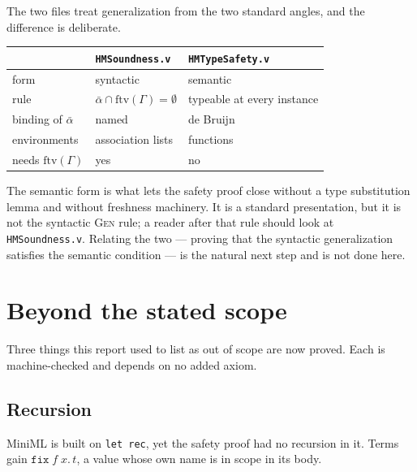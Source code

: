 \documentclass[11pt,a4paper]{article}
\newcommand{\ftv}{\mathrm{ftv}}
\newcommand{\subst}[3]{#1[#2 := #3]}
\newcommand{\step}{\longrightarrow}
\begin{document}
The two files treat generalization from the two standard angles, and the
difference is deliberate.

\begin{center}
\begin{tabular}{lll}
  & \texttt{HMSoundness.v} & \texttt{HMTypeSafety.v} \\
  \hline
  form & syntactic & semantic \\
  rule & $\bar\alpha \cap \ftv(\Gamma) = \emptyset$
       & typeable at every instance \\
  binding of $\bar\alpha$ & named & de Bruijn \\
  environments & association lists & functions \\
  needs $\ftv(\Gamma)$ & yes & no \\
\end{tabular}
\end{center}

The semantic form is what lets the safety proof close without a type
substitution lemma and without freshness machinery.  It is a standard
presentation, but it is not the syntactic \textsc{Gen} rule; a reader after
that rule should look at \texttt{HMSoundness.v}.  Relating the two --- proving
that the syntactic generalization satisfies the semantic condition --- is the
natural next step and is not done here.

\section{Beyond the stated scope}
\label{sec:beyond}

Three things this report used to list as out of scope are now proved.  Each is
machine-checked and depends on no added axiom.

\subsection{Recursion}

MiniML is built on \texttt{let rec}, yet the safety proof had no recursion in
it.  Terms gain $\mathtt{fix}\;f\;x.\,t$, a value whose own name is in scope in
its body.

\end{document}
